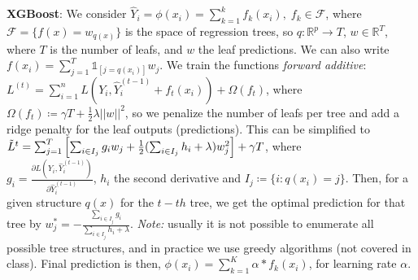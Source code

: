 \textbf{XGBoost}: We consider $\hat{Y}_i = \phi (x_i) = \sum_{k=1}^k f_k(x_i), \; f_k \in \mathcal{F}$, where $\mathcal{F} = \{ f(x) = w_{q(x)} \}$ is the space of regression trees, so $q \colon \mathbb{R}^p \to T$, $w \in \mathbb{R}^T$, where $T$ is the number of leafs, and $w$ the leaf predictions. We can also write $f(x_i) = \sum_{j=1}^T \mathds{1}_{[j = q(x_i)]}w_j$. We train the functions \textit{forward additive}: \\
$L^{(t)}=\sum_{i=1}^n L\left(Y_i, \hat{Y}_i^{(t-1)} + f_t(x_i)\right) + \Omega(f_t)$, where $\Omega(f_t) \coloneqq \gamma T + \frac{1}{2}\lambda ||w||^2$, so we penalize the number of leafs per tree and add a ridge penalty for the leaf outputs (predictions). This can be simplified to \\
$\Tilde{L}^t = \sum_{j=1}^T \left[ \sum_{i\in I_j} g_i w_j + \frac{1}{2} (\sum_{i \in I_j}h_i + \lambda) w_j^2 \right] + \gamma T$, where\\
$g_i = \frac{\partial L(Y_i, \hat{Y}_i^{(t-1)})}{\partial \hat{Y}_i^{(t-1)}}$, $h_i$ the second derivative and $I_j \coloneqq \{ i \colon q(x_i) = j \}$. Then, for a given structure $q(x)$ for the $t-th$ tree, we get the optimal prediction for that tree by $w_j^* = -\frac{\sum_{i \in I_j}g_i}{\sum_{i \in I_j} h_i + \lambda}$. \emph{Note:} usually it is not possible to enumerate all possible tree structures, and in practice we use greedy algorithms (not covered in class). Final prediction is then, $\phi(x_i) = \sum_{k=1}^{K} \alpha * f_k(x_i)$, for learning rate $\alpha$.

